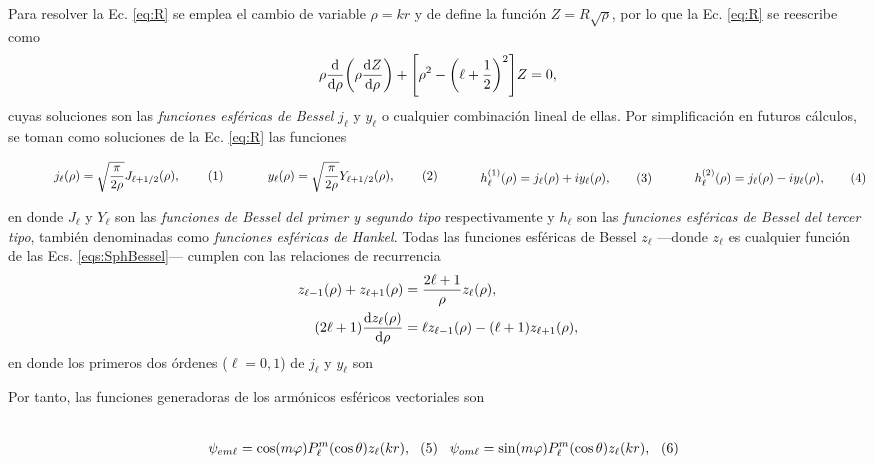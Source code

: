 Para resolver la Ec. \eqref{eq:R} se emplea el cambio de variable $\rho = k r$ y de define la función $Z =R\sqrt{\rho}$, por lo que la Ec. \eqref{eq:R} se reescribe como
	\begin{equation}
	\rho \dv{\rho}\qty(\rho\dv{Z}{\rho})+\qty[\rho^2-\qty(\ell+\frac12)^2] Z = 0,
	\end{equation}
cuyas soluciones son las \emph{funciones esféricas de Bessel} $j_\ell$ y $y_\ell$ o cualquier combinación lineal de ellas. Por simplificación en futuros cálculos, se toman como soluciones de la Ec. \eqref{eq:R} las funciones

	\begin{subequations}
	\eqhalf{j_\ell (\rho) = \sqrt{\frac{\pi}{2\rho}} J_{\ell+1/2}(\rho), \label{eq:jn}}
	\eqhalf{y_\ell (\rho) = \sqrt{\frac{\pi}{2\rho}} Y_{\ell+1/2}(\rho), \label{eq:yn}}
	\eqhalf{h_\ell^{(1)} (\rho) = j_\ell(\rho) + i y_\ell(\rho), \label{eq:h1}}
	\eqhalf{h_\ell^{(2)} (\rho) =  j_\ell(\rho) - i y_\ell(\rho), \label{eq:h2}}
	\label{eqs:SphBessel}
	\end{subequations}

\noindent	
en donde $J_\ell$ y $Y_\ell$ son las \emph{funciones de Bessel del primer y segundo tipo} respectivamente y $h_\ell$ son las \emph{funciones esféricas de Bessel del tercer tipo}, también denominadas como \emph{funciones esféricas de Hankel}. Todas las funciones esféricas de Bessel $z_\ell$ ---donde $z_\ell$ es cualquier función de las Ecs. \eqref{eqs:SphBessel}--- cumplen con las  relaciones de recurrencia
	\begin{align}
	z_{\ell-1}(\rho) + z_{\ell+1}(\rho) &=\frac{2\ell+1}{\rho} z_\ell(\rho),\\
	(2\ell + 1) \dv{z_\ell(\rho)}{\rho} &= \ell z_{\ell-1}(\rho) - (\ell+1)z_{\ell+1}(\rho),
	\end{align}
en donde los primeros dos órdenes ($\ell=0,1$) de $j_\ell$ y $y_\ell$ son


\vspace*{-1em}\noindent
Por tanto, las funciones generadoras de los armónicos esféricos vectoriales son

	\begin{subequations}
	\eqhalf{\psi_{em\ell} = \cos(m\varphi) P_\ell^m( \cos \theta) z_\ell(k r),}
	\eqhalf{\psi_{om\ell} = \sin(m\varphi) P_\ell^m( \cos \theta) z_\ell(k r),}
	\label{eq:psieo}
	\end{subequations}
	
